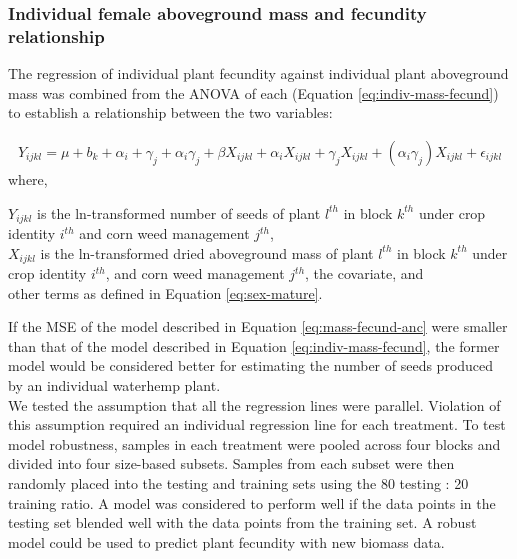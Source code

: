 \documentclass[
]{article}
\begin{document}
\hypertarget{individual-female-aboveground-mass-and-fecundity-relationship}{%
\subsubsection*{Individual female aboveground mass and fecundity relationship}\label{individual-female-aboveground-mass-and-fecundity-relationship}}

The regression of individual plant fecundity against individual plant aboveground mass was combined from the ANOVA of each (Equation \eqref{eq:indiv-mass-fecund}) to establish a relationship between the two variables:

\begin{align} 
Y_{ijkl} = \mu + b_k + \alpha_i + \gamma_j +\alpha_i \gamma_j + \beta X_{ijkl} + \alpha_i X_{ijkl} + \gamma_j X_{ijkl} + (\alpha_i \gamma_j)X_{ijkl} + \epsilon_{ijkl} \label{eq:mass-fecund-anc}
\end{align}
where,

\(Y_{ijkl}\) is the ln-transformed number of seeds of plant \(l^{th}\) in block \(k^{th}\) under crop identity \(i^{th}\) and corn weed management \(j^{th}\),\\
\(X_{ijkl}\) is the ln-transformed dried aboveground mass of plant \(l^{th}\) in block \(k^{th}\) under crop identity \(i^{th}\), and corn weed management \(j^{th}\), the covariate, and\\
other terms as defined in Equation \eqref{eq:sex-mature}.

If the MSE of the model described in Equation \eqref{eq:mass-fecund-anc} were smaller than that of the model described in Equation \eqref{eq:indiv-mass-fecund}, the former model would be considered better for estimating the number of seeds produced by an individual waterhemp plant.\\  
We tested the assumption that all the regression lines were parallel. Violation of this assumption required an individual regression line for each treatment.
To test model robustness, samples in each treatment were pooled across four blocks and divided into four size-based subsets. Samples from each subset were then randomly placed into the testing and training sets using the 80 testing : 20 training ratio. A model was considered to perform well if the data points in the testing set blended well with the data points from the training set. A robust model could be used to predict plant fecundity with new biomass data.
\end{document}
